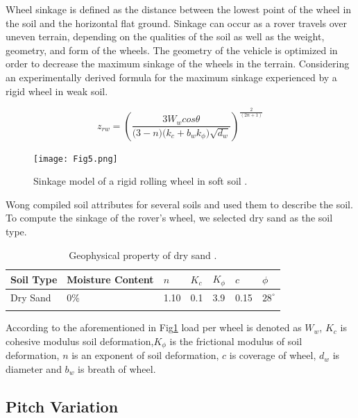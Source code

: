 \documentclass[default,iicol]{sn-jnl}
\theoremstyle{thmstyleone}
\theoremstyle{thmstyletwo}
\theoremstyle{thmstylethree}
\begin{document}
Wheel sinkage is defined as the distance between the lowest point of the wheel in the soil and the horizontal flat ground. Sinkage can occur as a rover travels over uneven terrain, depending on the qualities of the soil as well as the weight, geometry, and form of the wheels. The geometry of the vehicle is optimized in order to decrease the maximum sinkage of the wheels in the terrain. Considering \cite{bib9} an experimentally derived formula for the maximum sinkage experienced by a rigid wheel in weak soil.

\begin{equation}
{ z_{rw} =  \left( \frac{3 W_{w} cos  \theta }{ \big(3-n\big) \big( k_{c}+ b_{w} k_{ \phi }   \big) \sqrt{ d_{w} }   } \right )^{ \frac{2}{ \left(2n+1\right) } } }
\end{equation}

\begin{figure}[ht]
\centering
\texttt{[image: Fig5.png]}
\caption{Sinkage model of a rigid rolling wheel in soft soil \cite{bib9}.}\label{fig5}
\end{figure}

Wong \cite{bib10} compiled soil attributes for several soils and used them to describe the soil. To compute the sinkage of the rover's wheel, we selected dry sand as the soil type.

\begin{table}[ht]
\begin{center}
\begin{minipage}{174pt}
\caption{ Geophysical property of dry sand \cite{bib10}.}\label{tab1}%
\begin{tabular}{@{}lllllll@{}}
\toprule
Soil Type & Moisture Content  & $n$ & $K_c$ &$K_\phi$ & $c$ & $\phi$\\
\midrule
Dry Sand    & 0\%  &  1.10  & 0.1 &3.9 &0.15 &$28^{\circ}$\\

\botrule
\end{tabular}

\end{minipage}
\end{center}
\end{table}
According to the aforementioned in Fig\ref{fig5} load per wheel is denoted as $W_w$, $K_c$ is cohesive modulus soil deformation,$K_\phi$ is the frictional modulus of soil deformation, $n$ is an exponent of soil deformation, $c$ is coverage of wheel, $d_w$ is diameter and $b_w$ is breath of wheel. 

\subsection{Pitch Variation }\label{subsec5}
\end{document}
